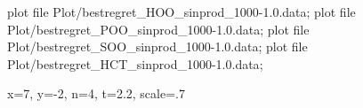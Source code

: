 \documentclass{article}
\begin{document}
{\begin{mygraph}
                {}{}
   plot file {Plot/bestregret_HOO_sinprod_1000-1.0.data};
   plot file {Plot/bestregret_POO_sinprod_1000-1.0.data};
   plot file {Plot/bestregret_SOO_sinprod_1000-1.0.data};
   plot file {Plot/bestregret_HCT_sinprod_1000-1.0.data};
  \begin{mylegend}{x=7, y=-2, n=4, t=2.2, scale=.7}
	  \end{mylegend}
\end{mygraph}}
\end{document}
